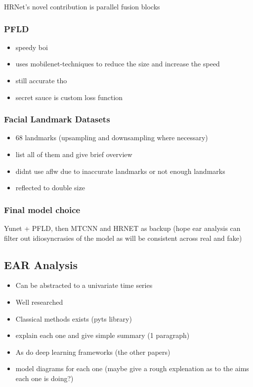 HRNet's novel contribution is parallel fusion blocks 

\subsubsection{PFLD}

\begin{itemize}
    \item speedy boi
    \item uses mobilenet-techniques to reduce the size and increase the speed
    \item still accurate tho
    \item secret sauce is custom loss function
\end{itemize}

\subsubsection{Facial Landmark Datasets}
\label{sec:face-datasets}

\begin{itemize}
    \item 68 landmarks (upsampling and downsampling where necessary)
    \item list all of them and give brief overview
    \item didnt use aflw due to inaccurate landmarks or not enough landmarks
    \item reflected to double size
\end{itemize}

\subsubsection{Final model choice}

Yunet + PFLD, then MTCNN and HRNET as backup (hope ear analysis can filter out idiosyncrasies of the model as will be consistent across real and fake)

\subsection{EAR Analysis}

\begin{itemize}
    \item Can be abstracted to a univariate time series
    \item Well researched
    \item Classical methods exists (pyts library)
    \item explain each one and give simple summary (1 paragraph)
    \item As do deep learning frameworks (the other papers)
    \item model diagrams for each one (maybe give a rough explenation as to the aims each one is doing?)
\end{itemize}

